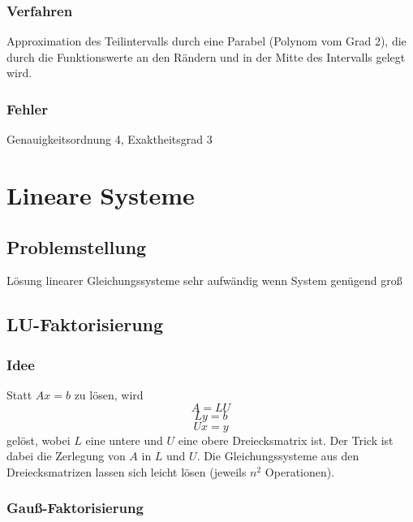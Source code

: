 \documentclass[a4paper, 12pt]{article}
\begin{document}
\subsubsection*{Verfahren}
Approximation des Teilintervalls durch eine Parabel (Polynom vom Grad 2), die durch die Funktionswerte an den Rändern und in der Mitte des Intervalls gelegt wird.

\subsubsection*{Fehler}
Genauigkeitsordnung 4, Exaktheitsgrad 3



\section{Lineare Systeme}


\subsection{Problemstellung}
Lösung linearer Gleichungssysteme sehr aufwändig wenn System genügend groß


\subsection{LU-Faktorisierung}

\subsubsection*{Idee}
Statt \(Ax=b\) zu lösen, wird
\[A=LU\]
\[Ly=b\]
\[Ux=y\]
gelöst, wobei \(L\) eine untere und \(U\) eine obere Dreiecksmatrix ist. Der Trick ist dabei die Zerlegung von \(A\) in \(L\) und \(U\). Die Gleichungssysteme aus den Dreiecksmatrizen lassen sich leicht lösen (jeweils \(n^2\) Operationen).

\subsubsection*{Gauß-Faktorisierung}
\end{document}
